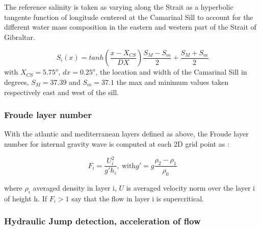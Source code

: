The reference salinity is taken as varying along the Strait as a hyperbolic tangente function of longitude centered at the Camarinal Sill to account for the different water mass composition in the eastern and western part of the Strait of Gibraltar. %



\begin{equation}
	S_i(x)=tanh(\frac{x-X_{CS}}{DX})\frac{S_M-S_m}{2}+\frac{S_M+S_m}{2}
\end{equation}
with $X_{CS}=5.75^o$, $dx=0.25^o$, the location and width of the Camarinal Sill in degrees, $S_M=37.39$ and $S_m=37.1$ the max and minimum values taken respectively east and west of the sill.


\subsubsection{Froude layer number}

With the atlantic and mediterranean layers defined as above, the Froude layer number for internal gravity wave is computed at each 2D grid point as : 

\begin{equation}
F_i=\frac{U_i^2}{g'h_i} , \ \text{with} g'=g \frac{\rho_2-\rho_1}{\rho_0}
\end{equation}

where $\rho_i$ averaged density in layer i,  $U$ is averaged velocity norm over the layer i of height h. If $F_i>1$ say that the flow in layer i is supercritical.


\subsubsection{Hydraulic Jump detection, acceleration of flow}

